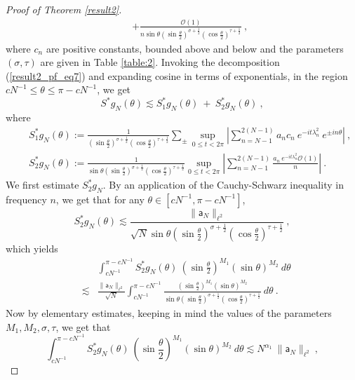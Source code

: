 \documentclass[12pt]{amsart}
\theoremstyle{definition}
\newcommand{\sa}{\textsf{a}}
\numberwithin{equation}{section}
\begin{document}
\begin{proof}[Proof of Theorem \ref{result2}]
\begin{eqnarray}
&&+\frac{\mathcal{O}(1)}{n\sin\theta \left(\sin\frac{\theta}{2}\right)^{\sigma+\frac{1}{2}}\left(\cos\frac{\theta}{2}\right)^{\tau+\frac{1}{2}}}\:,
\end{eqnarray}
where $c_n$ are positive constants, bounded above and below and the parameters $(\sigma,\tau)$ are given in Table \ref{table:2}. Invoking the decomposition (\ref{result2_pf_eq7}) and expanding cosine in terms of exponentials, in the region $cN^{-1} \le \theta \le \pi - cN^{-1}$, we  get
\begin{equation*}
S^*g_N(\theta) \lesssim S^*_1g_N(\theta) \:+\: S^*_2g_N(\theta)\:,
\end{equation*} 
where 
\begin{eqnarray*}
&&S^*_1g_N(\theta):= \frac{1}{\left(\sin\frac{\theta}{2}\right)^{\sigma+\frac{1}{2}}\left(\cos\frac{\theta}{2}\right)^{\tau+\frac{1}{2}}}\sum_{\pm}\sup_{0\le t<2\pi} \left|\sum_{n=N-1}^{2(N-1)} a_nc_n\:e^{-it\lambda^2_n}\:e^{\pm in\theta} \right| \:,\\
&&S^*_2g_N(\theta):= \frac{1}{\sin\theta \left(\sin\frac{\theta}{2}\right)^{\sigma+\frac{1}{2}}\left(\cos\frac{\theta}{2}\right)^{\tau+\frac{1}{2}}}\sup_{0\le t<2\pi}\left|\sum_{n=N-1}^{2(N-1)}\frac{a_n\:e^{-it\lambda^2_n} \mathcal{O}(1)}{n}\right|\:.
\end{eqnarray*}
We first estimate $S^*_2g_N$. By an application of the Cauchy-Schwarz inequality in frequency $n$, we get that for any $\theta \in \left[cN^{-1}, \pi - cN^{-1}\right]$,
\begin{equation*}
S^*_2g_N(\theta) \lesssim \frac{\|\sa_N\|_{\ell^2}}{\sqrt{N}\sin\theta \left(\sin\frac{\theta}{2}\right)^{\sigma+\frac{1}{2}}\left(\cos\frac{\theta}{2}\right)^{\tau+\frac{1}{2}}}\:,
\end{equation*}
which yields
\begin{eqnarray*}
&&\int_{cN^{-1}}^{\pi-cN^{-1}} S^*_2g_N(\theta)\:{\left(\sin \frac{\theta}{2}\right)}^{M_1} {(\sin \theta)}^{M_2}\:d\theta \\
&\lesssim & \frac{\|\sa_N\|_{\ell^2}}{\sqrt{N}}\int_{cN^{-1}}^{\pi-cN^{-1}} \frac{{\left(\sin \frac{\theta}{2}\right)}^{M_1} {(\sin \theta)}^{M_2}}{\sin\theta \left(\sin\frac{\theta}{2}\right)^{\sigma+\frac{1}{2}}\left(\cos\frac{\theta}{2}\right)^{\tau+\frac{1}{2}}}\:d\theta\:.
\end{eqnarray*}
Now by elementary estimates, keeping in mind the values of the parameters $M_1,M_2,\sigma,\tau$, we get that
\begin{equation} \label{result2_pf_eq8}
\int_{cN^{-1}}^{\pi-cN^{-1}} S^*_2g_N(\theta)\:{\left(\sin \frac{\theta}{2}\right)}^{M_1} {(\sin \theta)}^{M_2}\:d\theta \lesssim N^{\alpha_1}\:\|\sa_N\|_{\ell^2}\:,

\end{equation}
\end{proof}
\end{document}
